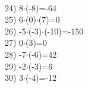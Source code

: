 \documentclass[a4paper,10pt]{article}
\begin{document}
\vspace{0.5cm}\\24)   8$\cdot$(-8)=-64
\vspace{0.5cm}\\25)   6$\cdot$(0)$\cdot$(7)=0
\vspace{0.5cm}\\26)   -5$\cdot$(-3)$\cdot$(-10)=-150
\vspace{0.5cm}\\27)   0$\cdot$(3)=0
\vspace{0.5cm}\\28)   -7$\cdot$(-6)=42
\vspace{0.5cm}\\29)   -2$\cdot$(-3)=6
\vspace{0.5cm}\\30)   3$\cdot$(-4)=-12
\vspace{0.5cm}\\\pagebreak
\end{document}
